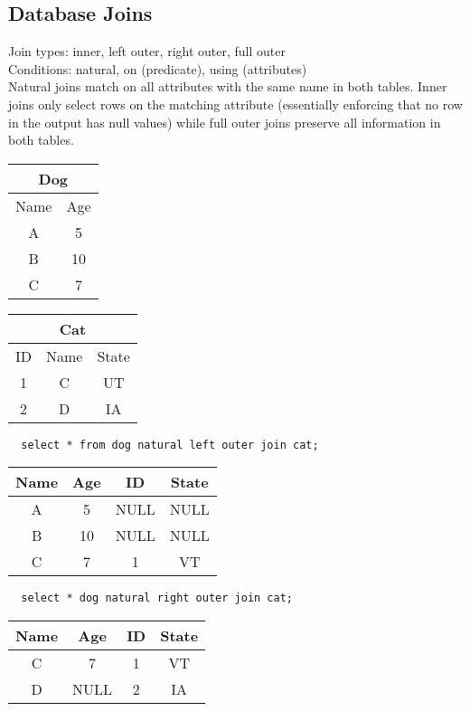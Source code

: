 \documentclass{math}
\begin{document}
\subsection*{Database Joins}
Join types: inner, left outer, right outer, full outer \\
Conditions: natural, on (predicate), using (attributes) \\
Natural joins match on all attributes with the same name in both tables. Inner
joins only select rows on the matching attribute (essentially enforcing that
no row in the output has null values) while full outer joins preserve all
information in both tables.
\begin{center}
  \begin{tabular}{|c|c|}
    \hline
    \multicolumn{2}{|c|}{Dog} \\
    \hline
    Name & Age \\
    \hline
    A & 5 \\
    B & 10 \\
    C & 7 \\
    \hline
  \end{tabular}
  \begin{tabular}{|c|c|c|}
    \hline
    \multicolumn{3}{|c|}{Cat} \\
    \hline
    ID & Name & State \\
    \hline
    1 & C & UT \\
    2 & D & IA \\
    \hline
  \end{tabular}
\end{center}
\begin{lstlisting}
  select * from dog natural left outer join cat;
\end{lstlisting}
\begin{center}
  \begin{tabular}{|c|c|c|c|}
    \hline
    Name & Age & ID & State \\
    \hline
    A & 5 & NULL & NULL \\
    B & 10 & NULL & NULL \\
    C & 7 & 1 & VT \\
    \hline
  \end{tabular}
\end{center}
\begin{lstlisting}
  select * dog natural right outer join cat;
\end{lstlisting}
\begin{center}
  \begin{tabular}{|c|c|c|c|}
    \hline
    Name & Age & ID & State \\
    \hline
    C & 7 & 1 & VT \\
    D & NULL & 2 & IA \\
    \hline
  \end{tabular}
\end{center}
\end{document}
